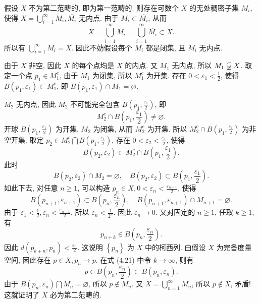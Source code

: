 \documentclass[openany]{ctexbook}
\makeatletter
\theoremstyle{kaiti}
\theoremstyle{normal}
\renewenvironment{proof}[1][\proofname]{\par
    \pushQED{\qed}%
    \normalfont \topsep6\p@\@plus6\p@\relax
    \trivlist
    \item\relax
    {\heiti #1}\hspace{2\labelsep}\ignorespaces
  }{%
    \popQED\endtrivlist\@endpefalse
  }
\makeatother
\begin{document}
\begin{proof}
假设 $X$ 不为第二范畴的, 即为第一范畴的. 则存在可数个 $X$ 的无处稠密子集 $M_{i}$, 使得 $X=\bigcup_{i=1}^{\infty} M_{i}, \overline{M_{i}}$ 无内点. 由于 $M_{i} \subset \overline{M_{i}}$, 从而
$$
X=\bigcup_{i=1}^{\infty} M_{i}=\bigcup_{i=1}^{\infty} \overline{M_{i}} \subset X.
$$
所以有 $\bigcup_{i=1}^{\infty} \overline{M_{i}}=X$. 因此不妨假设每个 $M_{i}$ 都是闭集, 且 $M_{i}$ 无内点. 

由于 $X$ 非空, 因此 $X$ 的每个点均是 $X$ 的内点. 又 $M_1$ 无内点, 所以 $M_1 \varsubsetneqq X$. 取定一个点 $p_1 \in M_1^{c}$, 由于 $M_1$ 为闭集, 所以 $M_1^{c}$ 为开集. 存在 $0<\varepsilon_1<\frac{1}{2}$, 使得 $B\left(p_1, \varepsilon_1\right) \subset M_1^{c}$, 即 $B\left(p_1, \varepsilon_1\right) \cap M_1=\varnothing.$

$M_2$ 无内点, 因此 $M_2$ 不可能完全包含 $B\left(p_1, \frac{\varepsilon_1}{2}\right)$, 即
$$
M_2^{c} \cap B\left(p_1, \frac{\varepsilon_1}{2}\right) \neq \varnothing.
$$
开球 $B\left(p_1, \frac{\varepsilon_1}{2}\right)$ 为开集, $M_2$ 为闭集, 从而 $M_2^{c}$ 为开集. 所以 $M_2^{c} \cap B\left(p_1, \frac{\varepsilon_1}{2}\right)$ 为非空开集. 取定 $p_2 \in M_2^{c} \bigcap B\left(p_1, \frac{\varepsilon_1}{2}\right)$, 存在 $0<\varepsilon_2<\frac{\varepsilon_1}{2}$, 使得
$$
B\left(p_2, \varepsilon_2\right) \subset M_2^{c} \cap B\left(p_1, \frac{\varepsilon_1}{2}\right).
$$
此时
$$
B\left(p_2, \varepsilon_2\right) \cap M_2=\varnothing, \quad B\left(p_2, \varepsilon_2\right) \subset B\left(p_1, \frac{\varepsilon_1}{2}\right).
$$
如此下去, 对任意 $n \geqslant 1$, 可以构造 $p_n \in X, 0<\varepsilon_n<\frac{\varepsilon_{n-1}}{2}$, 使得
$$
B\left(p_{n+1}, \varepsilon_{n+1}\right) \subset B\left(p_n, \frac{\varepsilon_n}{2}\right), \quad B\left(p_{n+1}, \varepsilon_{n+1}\right) \cap M_{n+1}=\varnothing.
$$
由于 $\varepsilon_1<\frac{1}{2}, \varepsilon_n<\frac{\varepsilon_{n-1}}{2}$, 所以 $\varepsilon_n<\frac{1}{2^n}$. 因此 $\varepsilon_n \rightarrow 0$. 又对固定的 $n \geqslant 1$, 任取 $k \geqslant 1$, 有
\begin{equation}
  p_{n+k} \in B\left(p_n, \frac{\varepsilon_n}{2}\right).
\end{equation}
因此 $d\left(p_{k+n}, p_n\right)<\frac{\varepsilon_n}{2}$. 这说明 $\left\{p_n\right\}$ 为 $X$ 中的柯西列. 由假设 $X$ 为完备度量空间, 因此存在 $p \in X, p_n \rightarrow p$. 在式 (4.21) 中令 $k \rightarrow \infty$, 则有
$$
p \in \bar{B}\left(p_n, \frac{\varepsilon_n}{2}\right) \subset B\left(p_n, \varepsilon_n\right).
$$
由于 $B\left(p_n, \varepsilon_n\right) \bigcap M_n=\varnothing$, 所以 $p \notin M_n$. 又 $X=\bigcup_{n=1}^{\infty} M_n$, 所以 $p \notin X$, 矛盾! 这就证明了 $X$ 必为第二范畴的.
\end{proof}
\end{document}
